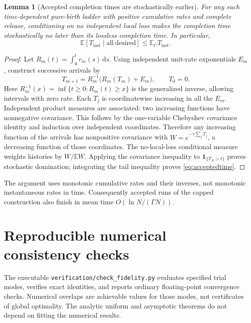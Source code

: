\documentclass[11pt,a4paper]{article}
\newtheorem{lemma}[theorem]{Lemma}
\newcommand{\E}{\mathbb E}
\newcommand{\dd}{\,\mathrm d}
\begin{document}
\begin{lemma}[Accepted completion times are stochastically earlier]
For any such time-dependent pure-birth ladder with positive
cumulative rates and complete release, conditioning on no
independent local loss makes the completion time stochastically
no later than its lossless completion time. In particular,
\begin{equation}
 \E[T_{\mathrm{last}}\mid\mathrm{all\ desired}]
 \le\E_C T_{\mathrm{last}}.
 \label{eq:acceptedtime}
\end{equation}
\end{lemma}
\begin{proof}
Let \(R_m(t)=\int_0^t r_m(s)\dd s\). Using independent
unit-rate exponentials \(E_m\), construct successive arrivals by
\begin{equation}
 T_{m+1}=R_m^{-1}\bigl(R_m(T_m)+E_m\bigr),\qquad T_0=0.
\end{equation}
Here \(R_m^{-1}(x)=\inf\{t\ge0:R_m(t)\ge x\}\) is the
generalized inverse, allowing intervals with zero rate.
Each \(T_j\) is coordinatewise increasing in all the \(E_m\).
Independent product measures are associated: two increasing
functions have nonnegative covariance. This follows by the
one-variable Chebyshev covariance identity and induction over
independent coordinates. Therefore any increasing function of
the arrivals has nonpositive covariance with
\(W=e^{-\gamma\sum_jT_j}\), a decreasing function of those
coordinates. The no-local-loss conditional measure weights
histories by \(W/\E W\). Applying the covariance inequality to
\(\mathbf1_{\{T_N>t\}}\) proves stochastic domination; integrating
the tail inequality proves \eqref{eq:acceptedtime}.
\end{proof}

The argument uses monotonic cumulative rates and their inverses,
not monotonic instantaneous rates in time. Consequently accepted
runs of the capped construction also finish in mean time
\(O(\ln N/(\Gamma N))\).

\section{Reproducible numerical consistency checks}
\label{sec:numerics}

The executable \texttt{verification/check\_fidelity.py} evaluates
specified trial modes, verifies exact identities, and reports
ordinary floating-point convergence checks. Numerical overlaps
are achievable values for those modes, not certificates of
global optimality. The analytic uniform and asymptotic theorems
do not depend on fitting the numerical results.
\end{document}
